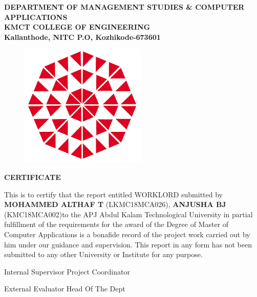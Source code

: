 \documentclass[a4paper,12pt]{report}
\begin{document}
\pagebreak

\begin{center}
	
\textbf{
\vspace*{8pt}
DEPARTMENT OF MANAGEMENT STUDIES \& COMPUTER
\vspace*{8pt}
APPLICATIONS\\
KMCT COLLEGE OF ENGINEERING\\
\vspace*{8pt}
Kallanthode, NITC P.O, Kozhikode-673601
}

\begin{figure}[bph]
	\centering
	\includegraphics[width=0.3023\linewidth]{kmct}
	\label{fig:ksblogo}
\end{figure}
\end{center}

{\centering \bf \large
	CERTIFICATE\par
}
\vspace*{10pt}
This is to certify that the report entitled WORKLORD submitted
by {\bf MOHAMMED ALTHAF T} (LKMC18MCA026), {\bf ANJUSHA BJ}
(KMC18MCA002)to the APJ Abdul Kalam Technological University
in partial fulfillment of the requirements for the award of the Degree of Master of Computer
Applications is a bonafide record of the project work carried out by him under our guidance and
supervision. This report in any form has not been submitted to any other University or Institute for
any purpose.

\begin{center}\vspace*{20pt}
	Internal Supervisor \hspace*{0pt} \hfill  Project Coordinator
\end{center}

\begin{center}\vspace*{40pt}
   External Evaluator \hspace*{0pt} \hfill  Head Of The Dept
\end{center}
	
\pagebreak
\end{document}
